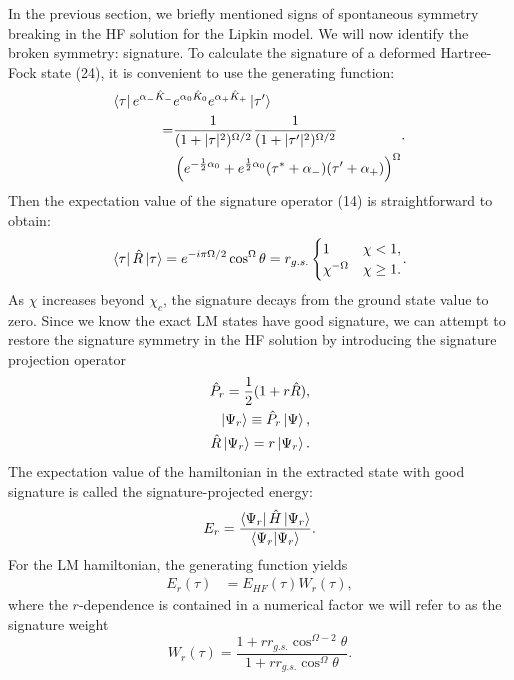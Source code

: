 \documentclass[prb,aps,twocolumn,showpacs,10pt]{revtex4-2}
\begin{document}
In the previous section, we briefly mentioned signs of spontaneous symmetry breaking in the HF solution for the Lipkin model. We will now identify the broken symmetry: signature. To calculate the signature of a deformed Hartree-Fock state (24), it is convenient to use the generating function:
\begin{align}
\begin{split}
\bra{\tau} e^{\alpha_- \hat{K}_-} & e^{\alpha_0 \hat{K}_0}  e^{\alpha_+ \hat{K}_+}
\ket{\tau'} \\
=&\frac{1}{(1+|\tau|^2)^{\Omega/2}} \frac{1}{(1+|\tau'|^2)^{\Omega/2}}\\
&\left( e^{-\frac{1}{2}\alpha_0} + e^{\frac{1}{2}\alpha_0} (\tau^* + \alpha_{-}) (\tau' +\alpha_+) \right)^\Omega
\end{split}.
\end{align}
Then the expectation value of the signature operator (14) is straightforward to obtain:
\begin{align}
\begin{split}
\bra{\tau} \hat{R} \ket{\tau} = e^{-i \pi \Omega/2} \cos^\Omega \theta=
r_{g.s.}
\begin{cases} 
      1 & \chi < 1,\\
       \chi^{-\Omega}& \chi \geq 1.
   \end{cases}
\end{split}.
\end{align}
As $\chi$ increases beyond $\chi_c$, the signature decays from the ground state value to zero. Since we know the exact LM states have good signature, we can attempt to restore the signature symmetry in the HF solution by introducing the signature projection operator
\begin{align}
\hat{P}_r = \frac{1}{2} (1+r\hat{R}),\\
\ket{\Psi_r} \equiv \hat{P}_r \ket{\Psi}, \\
 \hat{R}\ket{\Psi_r} = r \ket{\Psi_r}.
\end{align}
The expectation value of the hamiltonian in the extracted state with good signature is called the signature-projected energy:
\begin{equation}
E_r = \frac{\bra{\Psi_r} \hat{H} \ket{\Psi_r}}{\bra{\Psi_r} \ket{\Psi_r}}.
\end{equation}
For the LM hamiltonian, the generating function yields 
\begin{align}
E_r(\tau) &= E_{HF}(\tau) W_r(\tau),
\end{align}
where the $r$-dependence is contained in a numerical factor we will refer to as the signature weight
\begin{equation}
W_r(\tau) = \frac{1+r r_{g.s.} \cos^{\Omega-2} \theta}{1+r r_{g.s.} \cos^\Omega \theta}.
\end{equation}
\end{document}
